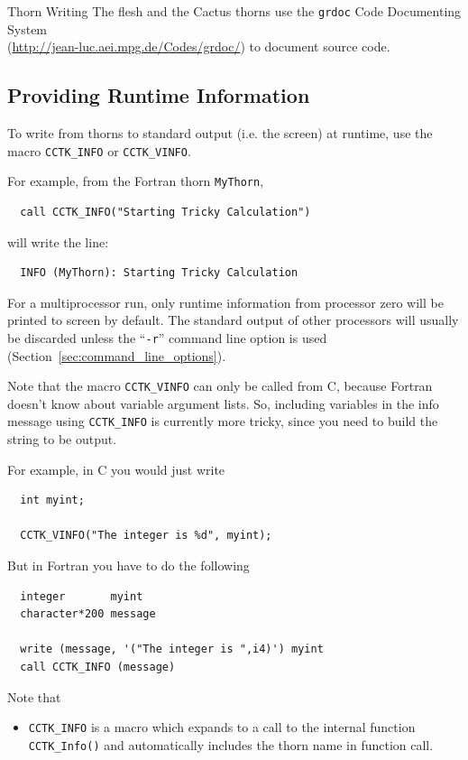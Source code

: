 \begin{cactuspart}{Thorn Writing}
The flesh and the Cactus thorns use the \texttt{grdoc} Code Documenting
System\\(\url{http://jean-luc.aei.mpg.de/Codes/grdoc/}) to document
source code.


\subsection{Providing Runtime Information}
\label{sec:prrutiin}

To write from thorns to standard output (i.e. the screen)
at runtime, use the macro \texttt{CCTK\_INFO} or \texttt{CCTK\_VINFO}.

For example, from the Fortran thorn \texttt{MyThorn},
\begin{verbatim}
  call CCTK_INFO("Starting Tricky Calculation")
\end{verbatim}
%
will write the line:
\begin{verbatim}
  INFO (MyThorn): Starting Tricky Calculation
\end{verbatim}

For a multiprocessor run, only runtime information from processor zero
will be printed to screen by default. The standard output of other processors
will usually be discarded unless the ``\texttt{-r}'' command line option is used
(Section~\ref{sec:command_line_options}).

Note that the macro \texttt{CCTK\_VINFO} can only be called from C, because
Fortran doesn't know about variable argument lists. So, including variables in
the info message using \texttt{CCTK\_INFO} is currently more tricky, since you
need to build the string to be output.

For example, in C you would just write
\begin{verbatim}
  int myint;

  CCTK_VINFO("The integer is %d", myint);
\end{verbatim}

But in Fortran you have to do the following
\begin{verbatim}
  integer       myint
  character*200 message

  write (message, '("The integer is ",i4)') myint
  call CCTK_INFO (message)
\end{verbatim}

Note that
\begin{itemize}
\item{} \texttt{CCTK\_INFO} is a macro which expands to a call to
        the internal function \texttt{CCTK\_Info()} and automatically includes
        the thorn name in function call.


\end{itemize}
\end{cactuspart}
